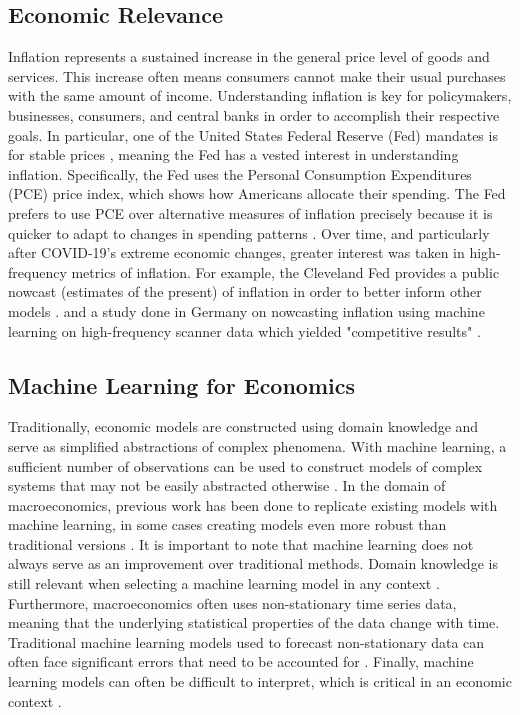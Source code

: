 \documentclass[conference]{IEEEtran}
\begin{document}
\subsection{Economic Relevance}
Inflation represents a sustained increase in the general price level of goods and services. This increase often means consumers cannot make their usual purchases with the same amount of income. Understanding inflation is key for policymakers, businesses, consumers, and central banks in order to accomplish their respective goals. In particular, one of the United States Federal Reserve (Fed) mandates is for stable prices \cite{fomc_statement}, meaning the Fed has a vested interest in understanding inflation. Specifically, the Fed uses the Personal Consumption Expenditures (PCE) price index, which shows how Americans allocate their spending. The Fed prefers to use PCE over alternative measures of inflation precisely because it is quicker to adapt to changes in spending patterns \cite{fed_inflation}. Over time, and particularly after COVID-19’s extreme economic changes, greater interest was taken in high-frequency metrics of inflation. For example, the Cleveland Fed provides a public nowcast (estimates of the present) of inflation in order to better inform other models \cite{cleveland_nowcasting}. and a study done in Germany on nowcasting inflation using machine learning on high-frequency scanner data which yielded "competitive results" \cite{ecb_nowcasting}. 

\subsection{Machine Learning for Economics}
Traditionally, economic models are constructed using domain knowledge and serve as simplified abstractions of complex phenomena. With machine learning, a sufficient number of observations can be used to construct models of complex systems that may not be easily abstracted otherwise \cite{simeone_ml}. In the domain of macroeconomics, previous work has been done to replicate existing models with machine learning, in some cases creating models even more robust than traditional versions \cite{imf_rbc}. It is important to note that machine learning does not always serve as an improvement over traditional methods. Domain knowledge is still relevant when selecting a machine learning model in any context \cite{simeone_ml}. Furthermore, macroeconomics often uses non-stationary time series data, meaning that the underlying statistical properties of the data change with time. Traditional machine learning models used to forecast non-stationary data can often face significant errors that need to be accounted for \cite{acm_stationarity}. Finally, machine learning models can often be difficult to interpret, which is critical in an economic context \cite{boc_ml}.
\end{document}
